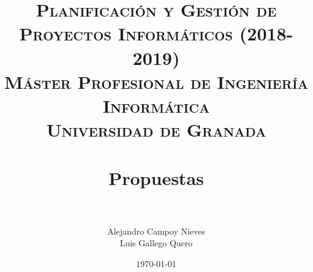 

\title{	
	\normalfont \normalsize 
	\textsc{\textbf{Planificación y Gestión de Proyectos Informáticos (2018-2019)} \\ Máster Profesional de Ingeniería Informática \\ Universidad de Granada} \\ [25pt] %
	\horrule{0.5pt} \\[0.4cm] %
	\huge Propuestas \\ %
	\horrule{2pt} \\[0.5cm] %
}

\author{Alejandro Campoy Nieves \\ Luis Gallego Quero} %
\date{\normalsize\today} %

\usepackage[spanish, es-tabla]{babel}
\usepackage{hyperref} %
\hypersetup{
	colorlinks=true,
	linkcolor=blue,
	filecolor=magenta,      
	urlcolor=blue,
}
\usepackage{graphicx}
\usepackage{amssymb, amsmath, amsbsy}
\usepackage{mathptmx}	
\usepackage{float}
\usepackage{booktabs}					%
\usepackage{eurosym}

\usepackage[table]{xcolor}
\usepackage{color}
\usepackage{colortbl}
\usepackage{multicol}
\usepackage{multirow}
\usepackage{booktabs}
\usepackage{tabularx}
\usepackage{array}
\usepackage{caption}
\usepackage{subcaption}




	\maketitle %
	
	\newpage %
	
	
	
	
